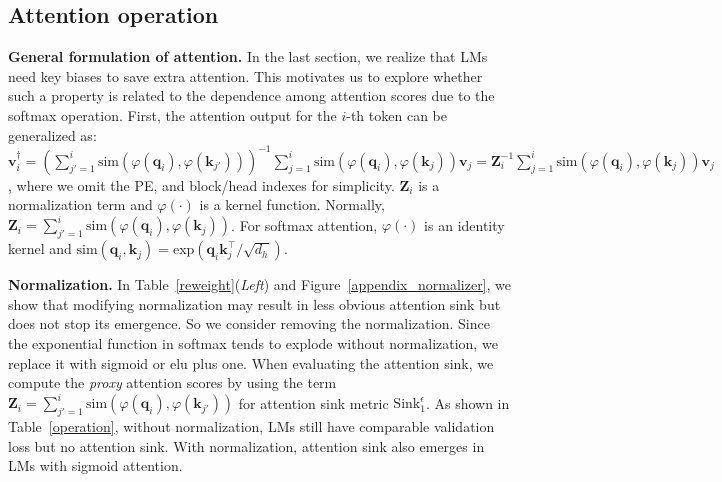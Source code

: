 \subsection{Attention operation}
\vspace{-0.2cm}
\textbf{General formulation of attention.} In the last section, we realize that LMs need key biases to save extra attention. This motivates us to explore whether such a property is related to the dependence among attention scores due to the softmax operation. First, the attention output for the $i$-th token can be generalized as: $\boldsymbol{v}_i^{\dagger}=\left(\sum_{j'=1}^i\textrm{sim}(\varphi(\boldsymbol{q}_i)\textrm{,}\,\varphi(\boldsymbol{k}_{j'}))\right)^{-1}\sum_{j=1}^i\textrm{sim}(\varphi(\boldsymbol{q}_i)\textrm{,}\,\varphi(\boldsymbol{k}_j))\boldsymbol{v}_j=\boldsymbol{Z}_i^{-1}\sum_{j=1}^i\textrm{sim}(\varphi(\boldsymbol{q}_i)\textrm{,}\,\varphi(\boldsymbol{k}_j))\boldsymbol{v}_j$,
where we omit the PE, and block/head indexes for simplicity. $\boldsymbol{Z}_i$ is a normalization term and $\varphi(\cdot)$ is a kernel function. Normally, $\boldsymbol{Z}_i=\sum_{j'=1}^i\textrm{sim}(\varphi(\boldsymbol{q}_i)\textrm{,}\,\varphi(\boldsymbol{k}_j))$. For softmax attention, $\varphi(\cdot)$ is an identity kernel and $\textrm{sim}(\boldsymbol{q}_i\textrm{,}\,\boldsymbol{k}_j)=\textrm{exp}(\boldsymbol{q}_i\boldsymbol{k}_j^\top/\sqrt{d_h})$.



\textbf{Normalization.} In Table~\ref{reweight}(\emph{Left}) and Figure~\ref{appendix_normalizer}, we show that modifying normalization may result in less obvious attention sink but does not stop its emergence. So we consider removing the normalization. Since the exponential function in softmax tends to explode without normalization, we replace it with sigmoid or elu plus one. When evaluating the attention sink, we compute the \textit{proxy} attention scores by using the term $\boldsymbol{Z}_i=\sum_{j'=1}^i\textrm{sim}(\varphi(\boldsymbol{q}_i)\textrm{,}\,\varphi(\boldsymbol{k}_{j'}))$ for attention sink metric $\textrm{Sink}_1^{\epsilon}$. As shown in Table~\ref{operation}, without normalization, LMs still have comparable validation loss but no attention sink. With normalization, attention sink also emerges in LMs with sigmoid attention.


